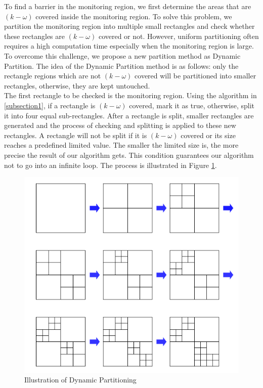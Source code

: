 To find a barrier in the monitoring region, we first determine the areas that are $(k-\omega)$ covered inside the monitoring region. To solve this problem, we partition the monitoring region into multiple small rectangles and check whether these rectangles are $(k-\omega)$ covered or not. However, uniform partitioning often requires a high computation time especially when the monitoring region is large. To overcome this challenge, we propose a new partition method as Dynamic Partition. The idea of the Dynamic Partition method is as follows: only the rectangle regions which are not $(k-\omega)$ covered will be partitioned into smaller rectangles, otherwise, they are kept untouched. \\
The first rectangle to be checked is the monitoring region. 
Using the algorithm in \ref{subsection1}, if a rectangle is $(k-\omega)$ covered, mark it as true, otherwise, split it into four equal sub-rectangles. After a rectangle is split, smaller rectangles are generated and the process of checking and splitting is applied to these new rectangles. A rectangle will not be split if it is $(k-\omega)$ covered or its size reaches a predefined limited value. The smaller the limited size is, the more precise the result of our algorithm gets. This condition guarantees our algorithm not to go into an infinite loop. The process is illustrated in Figure \ref{dynamic}.
%
\begin{figure}[h]
	\begin{center}
		\includegraphics[scale=1.]{Dynamic_Partition.pdf}
	\end{center}
	\caption{Illustration of Dynamic Partitioning}
	\label{dynamic}
\end{figure}

